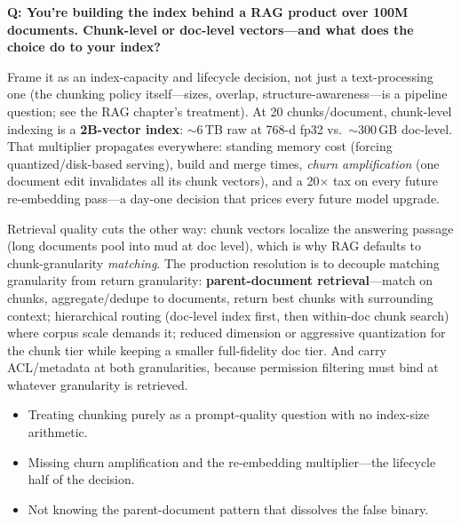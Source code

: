 \begin{interviewq}
\textbf{Q: You're building the index behind a RAG product over 100M documents. Chunk-level or doc-level vectors---and what does the choice do to your index?}

 \quad {} \quad \badgefreq{\freqmed}

\stronganswer

Frame it as an index-capacity and lifecycle decision, not just a text-processing one (the chunking policy itself---sizes, overlap, structure-awareness---is a pipeline question; see the RAG chapter's treatment). At 20 chunks/document, chunk-level indexing is a \textbf{2B-vector index}: $\sim$6\,TB raw at 768-d fp32 vs.\ $\sim$300\,GB doc-level. That multiplier propagates everywhere: standing memory cost (forcing quantized/disk-based serving), build and merge times, \textit{churn amplification} (one document edit invalidates all its chunk vectors), and a 20$\times$ tax on every future re-embedding pass---a day-one decision that prices every future model upgrade.

Retrieval quality cuts the other way: chunk vectors localize the answering passage (long documents pool into mud at doc level), which is why RAG defaults to chunk-granularity \textit{matching}. The production resolution is to decouple matching granularity from return granularity: \textbf{parent-document retrieval}---match on chunks, aggregate/dedupe to documents, return best chunks with surrounding context; hierarchical routing (doc-level index first, then within-doc chunk search) where corpus scale demands it; reduced dimension or aggressive quantization for the chunk tier while keeping a smaller full-fidelity doc tier. And carry ACL/metadata at both granularities, because permission filtering must bind at whatever granularity is retrieved.

\redflags
\begin{itemize}
    \item Treating chunking purely as a prompt-quality question with no index-size arithmetic.
    \item Missing churn amplification and the re-embedding multiplier---the lifecycle half of the decision.
    \item Not knowing the parent-document pattern that dissolves the false binary.
\end{itemize}



\end{interviewq}

